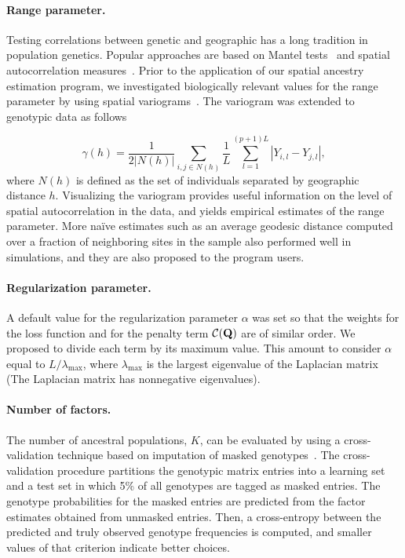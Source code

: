 \paragraph{Range parameter.} Testing correlations between genetic and geographic
has a long tradition in population genetics. Popular approaches are based on
Mantel tests~\citep{mantel1967} and spatial autocorrelation
measures~\citep{hardy1999, epperson1996}. Prior to the application of our spatial ancestry
estimation program, we investigated biologically relevant values for the range
parameter by using spatial variograms~\citep{Cressie1993}. The variogram was
extended to genotypic data as follows


\begin{equation}
\gamma(h) = \frac{1}{2 |N(h)|} \sum_{i,j \in N(h)} \frac{1}{L} \sum_{l = 1}^{(p+1)L} |Y_{i,l} - Y_{j,l}|,
\label{eq:gamma}
\end{equation}
where $N(h)$ is defined as the set of individuals separated by geographic
distance $h$. Visualizing the variogram provides useful information on the level
of spatial autocorrelation in the data, and yields empirical estimates of the
range parameter. More naïve estimates such as an average geodesic distance
computed over a fraction of neighboring sites in the sample also performed well
in simulations, and they are also proposed to the program users.

\paragraph{Regularization parameter.} A default value for the regularization
parameter $\alpha$ was set so that the weights for the loss function and for
the penalty term ${\cal C}({\bf Q})$ are of similar order. We proposed to divide
each term by its maximum value. This amount to consider $\alpha$ equal to $L /
\lambda_\max$, where $\lambda_\max$ is the largest eigenvalue of the Laplacian
matrix (The Laplacian matrix has nonnegative eigenvalues).

\paragraph{Number of factors.} The number of ancestral populations, $K$, can be
evaluated by using a cross-validation technique based on imputation of masked
genotypes~\citep{wold1978,eastment1982, Alexander2011, Frichot2014}. The
cross-validation procedure partitions the genotypic matrix entries into a
learning set and a test set in which 5\% of all genotypes are tagged as masked
entries. The genotype probabilities for the masked entries are predicted from
the factor estimates obtained from unmasked entries. Then, a cross-entropy
between the predicted and truly observed genotype frequencies is computed, and
smaller values of that criterion indicate better choices.

